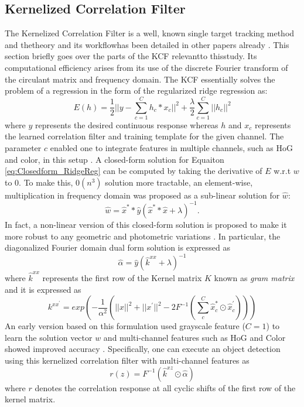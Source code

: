 \documentclass{bmvc2k}
\begin{document}
\subsection{Kernelized Correlation Filter} \label{sec:kcf}
The Kernelized Correlation Filter is a well, known single target
tracking method and thetheory and its workflowhas been detailed in
other papers already
\cite{henriques2012exploiting,henriques2015high}. This section briefly
goes over the parts of the KCF relevantto thisstudy. Its
computational efficiency arises from its use of the discrete Fourier
transform of the circulant matrix and frequency domain. The KCF
essentially solves the problem of a regression in the form of the
regularized ridge regression as:
\begin{equation}
E(h) = \frac{1}{2}||y-\sum_{c=1}^{C}h_{c}*x_{c}||^{2} + \frac{\lambda}{2}\sum_{c=1}^{C}||h_{c}||^{2}
\label{eq:Closedform_RidgeReg}
\end{equation}
where $y$ represents the desired continuous response whereas $h$ and
$x_{c}$ represents the learned correlation filter and training
template for the given channel. The parameter $c$ enabled one to
integrate features in multiple channels, such as HoG and color, in
this setup \cite{henriques2015high,galoogahi2013multi}. A closed-form
solution for Equaiton \ref{eq:Closedform_RidgeReg} can be computed by
taking the derivative of $E$ w.r.t $w$ to $0$. To make this,
$\mathcal{0}(n^{3})$ solution more tractable, an element-wise,
multiplication in frequency domain was proposed as a sub-linear
solution for $\hat{w}$:
\begin{equation}
\hat{w} = \hat{x}^{*}*\hat{y}(\hat{x}^{*}*\hat{x}+\lambda)^{-1}.
\label{eq:DiagonalizedPrimalSolution}
\end{equation}
In fact, a non-linear version of this closed-form solution is proposed
to make it more robust to any geometric and photometric variations
\cite{henriques2015high}. In particular, the diagonalized Fourier
domain dual form solution is expressed as
\begin{equation}
\hat{\alpha} = \hat{y}(\hat{k}^{xx}+\lambda)^{-1}
\label{eq:FourierDualDomainSolution}
\end{equation}
where $\hat{k}^{xx}$ represents the first row of the Kernel matrix $K$
known as \textit{gram matrix} and it is expressed as
\begin{equation}
k^{xx^{'}} = exp(-\dfrac{1}{\alpha^{2}}(||x||^{2}+||x^{'}||^{2}-2F^{-1}(\sum^{C}_{c}\hat{x}_{c}^{*}\odot \hat{x}_{c}^{'})))
\label{eq:GaussianCorrelationSingleChannel}
\end{equation}
An early version based on this formulation used grayscale feature
($C=1$) to learn the solution vector $w$ and multi-channel features
such as HoG and Color showed improved accuracy
\cite{henriques2015high,galoogahi2013multi,tang2015multi,ma2015long,bibi2015multi}. Specifically,
one can execute an object detection using this kernelized correlation
filter with multi-channel features as 
\begin{equation}
r(z) = F^{-1}(\hat{k}^{xz} \odot \hat{\alpha})
\end{equation}
where $r$ denotes the correlation response at all cyclic shifts of the
first row of the kernel matrix.
\end{document}
